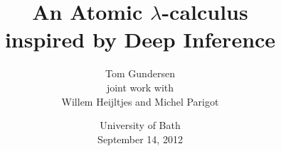 \documentclass[xcolor=dvipsnames]{beamer}
\title[Sharing Calculus]{An Atomic $\lambda$-calculus\\inspired by Deep Inference}
\author
{
Tom Gundersen\\
joint work with
\\
Willem Heijltjes and Michel Parigot
}
\date{University of Bath\\September 14, 2012}
\begin{document}
\begin{frame}
\titlepage
\end{frame}

\newtheorem{proposition}[theorem]{Proposition}
\theoremstyle{remark}
\newtheorem{remark}[theorem]{Remark}

\newcommand{\ttt}{\mathsf{t}}
\newcommand{\fff}{\mathsf{f}}


\vlupdate{\smash}

\vlnosmallleftlabels

\newcommand{\FV}{{\mathop{\mathsf{FV}}}}
\newcommand{\Var}{{\mathop{\mathsf{Var}}}}

\newcommand{\terauxshare}[3]
{
  {
    {#1}[{#2}\leftarrow{#3}]
  }
}
\newcommand{\typeauxshare}[3]
{
  {
    {#1}[{#2}\leftarrow{#3}]
  }
}
\newcommand{\terauxdist}[3]
{
  {
    {#1}[{#2}\twoheadleftarrow{#3}]
  }
}


\newcommand{\tervar}[1]
{
  {#1}
}
\newcommand{\terabs}[2]
{
  {\lambda{#1}.{#2}}
}
\newcommand{\terapp}[2]
{
  {({#1}){#2}}
}
\newcommand{\tershare}[4]
{
  {
    \terauxshare
    {#1}
    {{#2},\dots,{#3}}
    {#4}
  }
}
\newcommand{\tertuple}[2]
{
  {
    {\langle}
    {#1},\dots,{#2}
    {\rangle}
  }
}
\newcommand{\terdist}[5]
{
  {
    \terauxdist
    {#1}
    {{#2},\dots,{#3}}
    {\lambda{#4}.{#5}}
  }
}
\newcommand{\tersub}[3]
{
  {
    {#1}\{{#2}/{#3}\}
  }
}
\end{document}
